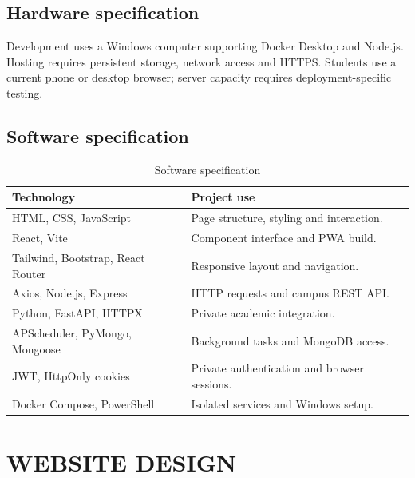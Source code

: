 \documentclass[10pt]{report}
\begin{document}
\section{Hardware specification}
Development uses a Windows computer supporting Docker Desktop and Node.js. Hosting requires persistent storage, network access and HTTPS. Students use a current phone or desktop browser; server capacity requires deployment-specific testing.

\section{Software specification}
\begin{table}[H]\centering\normalsize\renewcommand{\arraystretch}{1.12}
\begin{tabularx}{\linewidth}{|P{4.4cm}|Y|}\hline
\textbf{Technology}&\textbf{Project use}\\\hline
HTML, CSS, JavaScript&Page structure, styling and interaction.\\\hline
React, Vite&Component interface and PWA build\cite{react,vite}.\\\hline
Tailwind, Bootstrap, React Router&Responsive layout and navigation.\\\hline
Axios, Node.js, Express&HTTP requests and campus REST API.\\\hline
Python, FastAPI, HTTPX&Private academic integration\cite{fastapi}.\\\hline
APScheduler, PyMongo, Mongoose&Background tasks and MongoDB access.\\\hline
JWT, HttpOnly cookies&Private authentication and browser sessions.\\\hline
Docker Compose, PowerShell&Isolated services and Windows setup\cite{docker}.\\\hline
\end{tabularx}
\caption{Software specification}\label{tab:software}
\end{table}

\chapter{WEBSITE DESIGN}
\linespread{1.5}\selectfont
\end{document}
